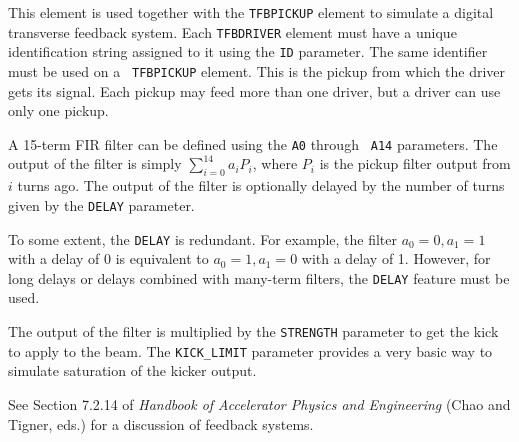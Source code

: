 This element is used together with the {\tt TFBPICKUP} element to
simulate a digital transverse feedback system.  Each {\tt TFBDRIVER}
element must have a unique identification string assigned to it using
the {\tt ID} parameter.  The same identifier must be used on a {\tt
TFBPICKUP} element.  This is the pickup from which the driver gets its
signal.  Each pickup may feed more than one driver, but a driver can
use only one pickup.

A 15-term FIR filter can be defined using the {\tt A0} through {\tt
A14} parameters.  The output of the filter is simply $\sum_{i=0}^{14}
a_i P_i$, where $P_i$ is the pickup filter output from $i$ turns ago.
The output of the filter is optionally delayed by the number of turns
given by the {\tt DELAY} parameter.

To some extent, the {\tt DELAY} is redundant.  For example, the filter
$a_0=0, a_1=1$ with a delay of 0 is equivalent to $a_0=1, a_1=0$ with
a delay of 1.  However, for long delays or delays combined with
many-term filters, the {\tt DELAY} feature must be used.

The output of the filter is multiplied by the {\tt STRENGTH} parameter
to get the kick to apply to the beam.  The {\tt KICK\_LIMIT} parameter
provides a very basic way to simulate saturation of the kicker output.

See Section 7.2.14 of {\em Handbook of Accelerator Physics and Engineering}
(Chao and Tigner, eds.) for a discussion of feedback systems.
